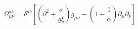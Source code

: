 \begin{equation}
\Omega _{\mu \nu }^{ab}=\delta ^{ab}\left[ \left( \partial ^{2}+\frac{\sigma
}{g\xi }\right) g_{\mu \nu }-\left( 1-\frac{1}{\alpha }\right) \partial
_{\mu }\partial _{\nu }\right]   \label{omab}
\end{equation}

